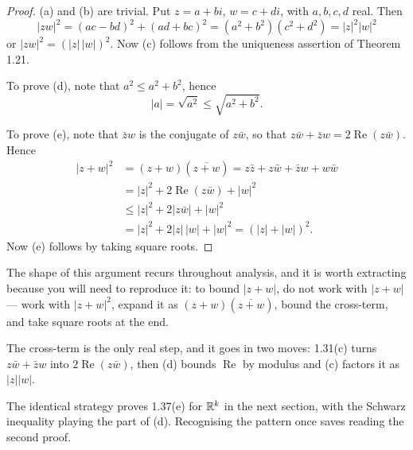 \begin{proof}
(a) and (b) are trivial. Put $z = a+bi$, $w = c+di$, with $a,b,c,d$ real. Then
\[ |zw|^2 = (ac-bd)^2+(ad+bc)^2 = (a^2+b^2)(c^2+d^2) = |z|^2|w|^2 \]
or $|zw|^2 = (|z|\,|w|)^2$. Now (c) follows from the uniqueness assertion of
Theorem 1.21.

To prove (d), note that $a^2 \le a^2+b^2$, hence
\[ |a| = \sqrt{a^2} \le \sqrt{a^2+b^2}. \]

To prove (e), note that $\bar z w$ is the conjugate of $z\bar w$, so that
$z\bar w + \bar z w = 2\operatorname{Re}(z\bar w)$. Hence
\begin{align*}
  |z+w|^2 &= (z+w)(\overline{z+w}) = z\bar z + z\bar w + \bar z w + w\bar w\\
          &= |z|^2 + 2\operatorname{Re}(z\bar w) + |w|^2\\
          &\le |z|^2 + 2|z\bar w| + |w|^2\\
          &= |z|^2 + 2|z|\,|w| + |w|^2 = (|z|+|w|)^2.
\end{align*}
Now (e) follows by taking square roots.
\end{proof}

\begin{unpack}
The shape of this argument recurs throughout analysis, and it is worth extracting
because you will need to reproduce it: to bound $|z+w|$, do not work with
$|z+w|$ --- work with $|z+w|^2$, expand it as $(z+w)(\overline{z+w})$, bound the
cross-term, and take square roots at the end.

The cross-term is the only real step, and it goes in two moves: 1.31(c) turns
$z\bar w + \bar z w$ into $2\operatorname{Re}(z\bar w)$, then (d) bounds
$\operatorname{Re}$ by modulus and (c) factors it as $|z||w|$.

The identical strategy proves 1.37(e) for $\mathbb{R}^k$ in the next section, with the
Schwarz inequality playing the part of (d). Recognising the pattern once saves
reading the second proof.
\end{unpack}

\begin{center}
\end{center}

